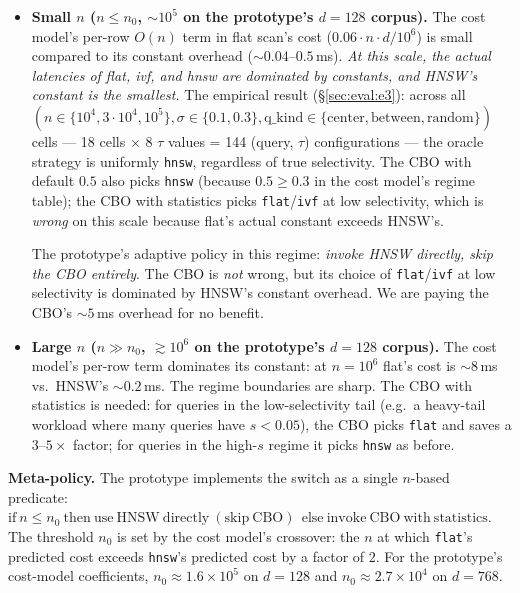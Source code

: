 \documentclass[sigconf,nonacm,review]{acmart}
\theoremstyle{plain}
\theoremstyle{definition}
\theoremstyle{remark}
\begin{document}
\begin{itemize}[leftmargin=*]
  \item \textbf{Small $n$ ($n \le n_0$, $\sim 10^5$ on the
    prototype's $d=128$ corpus).} The cost model's per-row
    $O(n)$ term in flat scan's cost
    ($0.06 \cdot n \cdot d / 10^6$) is small compared to its
    constant overhead ($\sim 0.04$--$0.5$\,ms). \emph{At this
    scale, the actual latencies of flat, ivf, and hnsw are
    dominated by constants, and HNSW's constant is the
    smallest.} The empirical result
    (\S\ref{sec:eval:e3}): across all
    $(n \in \{10^4, 3 \cdot 10^4, 10^5\}, \sigma \in
    \{0.1, 0.3\}, \mathrm{q\_kind} \in \{\mathrm{center},
    \mathrm{between}, \mathrm{random}\})$ cells
    --- 18 cells $\times$ 8 $\tau$ values = 144 (query, $\tau$)
    configurations --- the oracle strategy is uniformly
    \texttt{hnsw}, regardless of true selectivity. The CBO
    with default $0.5$ also picks \texttt{hnsw} (because
    $0.5 \ge 0.3$ in the cost model's regime table); the
    CBO with statistics picks \texttt{flat}/\texttt{ivf} at
    low selectivity, which is \emph{wrong} on this scale
    because flat's actual constant exceeds HNSW's.

    The prototype's adaptive policy in this regime:
    \emph{invoke HNSW directly, skip the CBO entirely}. The
    CBO is \emph{not} wrong, but its choice of
    \texttt{flat}/\texttt{ivf} at low selectivity is dominated
    by HNSW's constant overhead. We are paying the
    CBO's $\sim 5$\,ms overhead for no benefit.

  \item \textbf{Large $n$ ($n \gg n_0$, $\gtrsim 10^6$ on the
    prototype's $d=128$ corpus).} The cost model's
    per-row term dominates its constant: at $n = 10^6$
    flat's cost is $\sim 8$\,ms vs.\ HNSW's $\sim 0.2$\,ms.
    The regime boundaries are sharp. The CBO with
    statistics is needed: for queries in the low-selectivity
    tail (e.g.\ a heavy-tail workload where many queries
    have $s < 0.05$), the CBO picks \texttt{flat} and saves
    a $3$--$5\times$ factor; for queries in the high-$s$
    regime it picks \texttt{hnsw} as before.
\end{itemize}

\noindent\textbf{Meta-policy.} The prototype implements
the switch as a single $n$-based predicate: $\mathrm{if}\ n \le
n_0\ \mathrm{then}\ \mathrm{use\ HNSW\ directly\ (skip\ CBO)}\ \
\mathrm{else}\ \mathrm{invoke\ CBO\ with\ statistics}$. The
threshold $n_0$ is set by the cost model's crossover: the
$n$ at which \texttt{flat}'s predicted cost exceeds
\texttt{hnsw}'s predicted cost by a factor of $2$. For the
prototype's cost-model coefficients, $n_0 \approx 1.6 \times
10^5$ on $d = 128$ and $n_0 \approx 2.7 \times 10^4$ on $d = 768$.
\end{document}
